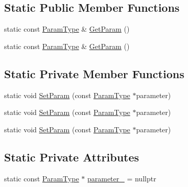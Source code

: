 \subsection*{Static Public Member Functions}
\begin{DoxyCompactItemize}
\item 
static const \mbox{\hyperlink{classtesting_1_1_with_param_interface_a343febaaebf1f025bda484f841d4fec1}{Param\+Type}} \& \mbox{\hyperlink{classtesting_1_1_with_param_interface_a1078d4493d7aa4d3e50d1d6c661bee4d}{Get\+Param}} ()
\item 
static const \mbox{\hyperlink{classtesting_1_1_with_param_interface_a343febaaebf1f025bda484f841d4fec1}{Param\+Type}} \& \mbox{\hyperlink{classtesting_1_1_with_param_interface_a1078d4493d7aa4d3e50d1d6c661bee4d}{Get\+Param}} ()
\end{DoxyCompactItemize}
\subsection*{Static Private Member Functions}
\begin{DoxyCompactItemize}
\item 
static void \mbox{\hyperlink{classtesting_1_1_with_param_interface_a471e12a61e83347675b649465bc5aabc}{Set\+Param}} (const \mbox{\hyperlink{classtesting_1_1_with_param_interface_a343febaaebf1f025bda484f841d4fec1}{Param\+Type}} $\ast$parameter)
\item 
static void \mbox{\hyperlink{classtesting_1_1_with_param_interface_a471e12a61e83347675b649465bc5aabc}{Set\+Param}} (const \mbox{\hyperlink{classtesting_1_1_with_param_interface_a343febaaebf1f025bda484f841d4fec1}{Param\+Type}} $\ast$parameter)
\item 
static void \mbox{\hyperlink{classtesting_1_1_with_param_interface_a471e12a61e83347675b649465bc5aabc}{Set\+Param}} (const \mbox{\hyperlink{classtesting_1_1_with_param_interface_a343febaaebf1f025bda484f841d4fec1}{Param\+Type}} $\ast$parameter)
\end{DoxyCompactItemize}
\subsection*{Static Private Attributes}
\begin{DoxyCompactItemize}
\item 
static const \mbox{\hyperlink{classtesting_1_1_with_param_interface_a343febaaebf1f025bda484f841d4fec1}{Param\+Type}} $\ast$ \mbox{\hyperlink{classtesting_1_1_with_param_interface_ad809d968c4285b535c5c74718d40ccf0}{parameter\+\_\+}} = nullptr
\end{DoxyCompactItemize}
